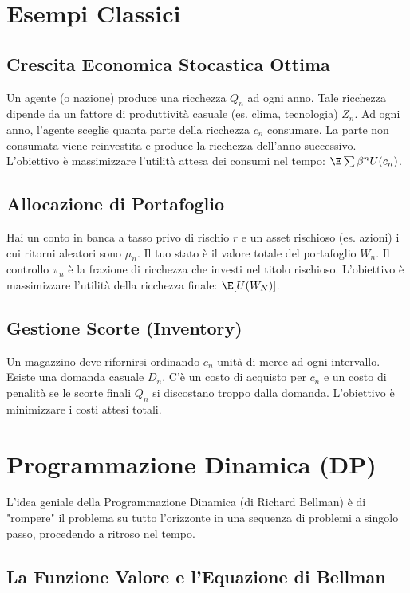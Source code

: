 \section{Esempi Classici}

\subsection{Crescita Economica Stocastica Ottima}
Un agente (o nazione) produce una ricchezza $Q_n$ ad ogni anno. Tale ricchezza dipende da un fattore di produttività casuale (es. clima, tecnologia) $Z_n$. Ad ogni anno, l'agente sceglie quanta parte della ricchezza $c_n$ consumare. La parte non consumata viene reinvestita e produce la ricchezza dell'anno successivo. L'obiettivo è massimizzare l'utilità attesa dei consumi nel tempo: $\E \sum \beta^n U(c_n)$.

\subsection{Allocazione di Portafoglio}
Hai un conto in banca a tasso privo di rischio $r$ e un asset rischioso (es. azioni) i cui ritorni aleatori sono $\mu_n$. Il tuo stato è il valore totale del portafoglio $W_n$. Il controllo $\pi_n$ è la frazione di ricchezza che investi nel titolo rischioso. L'obiettivo è massimizzare l'utilità della ricchezza finale: $\E [ U(W_N) ]$.

\subsection{Gestione Scorte (Inventory)}
Un magazzino deve rifornirsi ordinando $c_n$ unità di merce ad ogni intervallo. Esiste una domanda casuale $D_n$. C'è un costo di acquisto per $c_n$ e un costo di penalità se le scorte finali $Q_n$ si discostano troppo dalla domanda. L'obiettivo è minimizzare i costi attesi totali.

\section{Programmazione Dinamica (DP)}

L'idea geniale della Programmazione Dinamica (di Richard Bellman) è di "rompere" il problema su tutto l'orizzonte in una sequenza di problemi a singolo passo, procedendo a ritroso nel tempo.

\subsection{La Funzione Valore e l'Equazione di Bellman}

